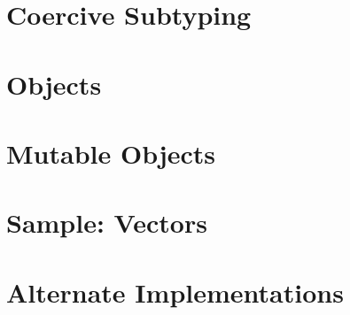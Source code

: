 \documentclass[a4paper]{article}
\begin{document}
\section{Coercive Subtyping}
\label{sec:subtyping}
 

\section{Objects}
\label{sec:objects}
 

\section{Mutable Objects}
\label{sec:mutable_objects}
 

\section{Sample: Vectors}
\label{sec:vectors}
 

\section{Alternate Implementations}
\label{sec:alternate}
 
\end{document}
